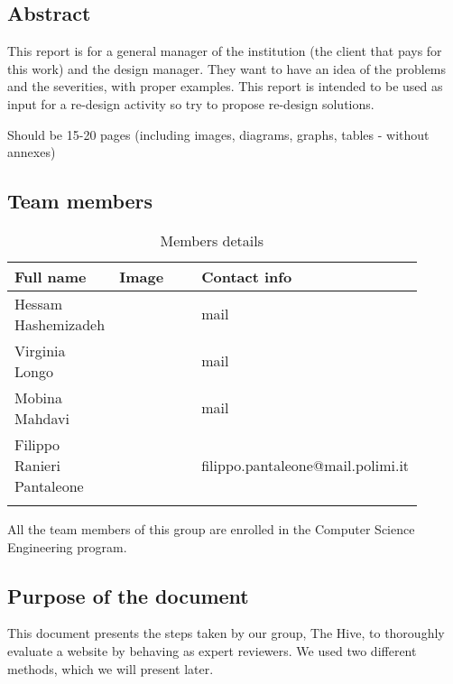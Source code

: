 \subsection{Abstract}
This report is for a general manager of the institution (the client that pays for this work) and the design manager. They want to have an idea of the problems and the severities, with proper examples.
This report is intended to be used as input for a re-design activity so try to propose re-design solutions.

Should be 15-20 pages (including images, diagrams, graphs, tables - without annexes)


\subsection{Team members}
\begin{longtable}
    {|m{0.2\linewidth}|m{0.2\linewidth}|m{0.5\linewidth}|}
            \hline
            \textbf{Full name} & \textbf{Image} & \textbf{Contact info}\\
            \hline
            \endhead
                Hessam Hashemizadeh &
                \centering
                & mail \\
            \hline
                Virginia Longo  &
                \centering
                & mail \\
            \hline
                Mobina Mahdavi &
                \centering
                & mail \\
            \hline
                Filippo Ranieri Pantaleone &
                \centering
                & filippo.pantaleone@mail.polimi.it \\
            \hline
            \caption{Members details}
            \label{table:mem_details}
\end{longtable}

All the team members of this group are enrolled in the Computer Science Engineering program.

\subsection{Purpose of the document}
This document presents the steps taken by our group, The Hive, to thoroughly evaluate a website by behaving as expert reviewers. We used two different methods, which we will present later.


